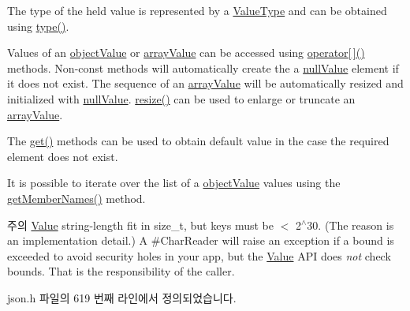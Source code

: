 The type of the held value is represented by a \hyperlink{namespace_json_a7d654b75c16a57007925868e38212b4e}{Value\+Type} and can be obtained using \hyperlink{class_json_1_1_value_a8ce61157a011894f0252ceed232312de}{type()}.

Values of an \hyperlink{namespace_json_a7d654b75c16a57007925868e38212b4eae8386dcfc36d1ae897745f7b4f77a1f6}{object\+Value} or \hyperlink{namespace_json_a7d654b75c16a57007925868e38212b4eadc8f264f36b55b063c78126b335415f4}{array\+Value} can be accessed using \hyperlink{class_json_1_1_value_a7d99f5dba388cdaa152ce6ef933d64ef}{operator\mbox{[}$\,$\mbox{]}()} methods. Non-\/const methods will automatically create the a \hyperlink{namespace_json_a7d654b75c16a57007925868e38212b4ea7d9899633b4409bd3fc107e6737f8391}{null\+Value} element if it does not exist. The sequence of an \hyperlink{namespace_json_a7d654b75c16a57007925868e38212b4eadc8f264f36b55b063c78126b335415f4}{array\+Value} will be automatically resized and initialized with \hyperlink{namespace_json_a7d654b75c16a57007925868e38212b4ea7d9899633b4409bd3fc107e6737f8391}{null\+Value}. \hyperlink{class_json_1_1_value_aa284353271ada427dbfa04a42f2be407}{resize()} can be used to enlarge or truncate an \hyperlink{namespace_json_a7d654b75c16a57007925868e38212b4eadc8f264f36b55b063c78126b335415f4}{array\+Value}.

The \hyperlink{class_json_1_1_value_a034eb7bf85a44fa759bdaa232788ca66}{get()} methods can be used to obtain default value in the case the required element does not exist.

It is possible to iterate over the list of a \hyperlink{namespace_json_a7d654b75c16a57007925868e38212b4eae8386dcfc36d1ae897745f7b4f77a1f6}{object\+Value} values using the \hyperlink{class_json_1_1_value_a79d7725dce6260317333e69022367ac9}{get\+Member\+Names()} method.

\begin{DoxyNote}{주의}
\hyperlink{class_json_1_1_value_ada6ba1369448fb0240bccc36efaa46f7}{Value} string-\/length fit in size\+\_\+t, but keys must be $<$ 2$^\wedge$30. (The reason is an implementation detail.) A \#\+Char\+Reader will raise an exception if a bound is exceeded to avoid security holes in your app, but the \hyperlink{class_json_1_1_value}{Value} A\+PI does {\itshape not} check bounds. That is the responsibility of the caller. 
\end{DoxyNote}


json.\+h 파일의 619 번째 라인에서 정의되었습니다.



